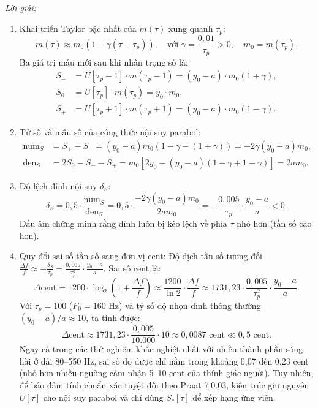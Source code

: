 \textit{Lời giải:}
\begin{enumerate}[leftmargin=1.5em]
    \item Khai triển Taylor bậc nhất của $m(\tau)$ xung quanh $\tau_p$:
    \begin{equation}
        m(\tau) \approx m_0 \left(1 - \gamma (\tau - \tau_p)\right), \quad \text{với } \gamma = \frac{0{,}01}{\tau_p} > 0, \quad m_0 = m(\tau_p).
    \end{equation}
    Ba giá trị mẫu mới sau khi nhân trọng số là:
    \begin{align}
        S_{-} &= U[\tau_p - 1] \cdot m(\tau_p - 1) = (y_0 - a) \cdot m_0 (1 + \gamma), \\
        S_{0} &= U[\tau_p] \cdot m(\tau_p) = y_0 \cdot m_0, \\
        S_{+} &= U[\tau_p + 1] \cdot m(\tau_p + 1) = (y_0 - a) \cdot m_0 (1 - \gamma).
    \end{align}
    \item Tử số và mẫu số của công thức nội suy parabol:
    \begin{align}
        \text{num}_S &= S_{+} - S_{-} = (y_0 - a) m_0 (1 - \gamma - (1 + \gamma)) = -2\gamma (y_0 - a) m_0, \\
        \text{den}_S &= 2S_0 - S_{-} - S_{+} = m_0 \left[2y_0 - (y_0 - a)(1 + \gamma + 1 - \gamma)\right] = 2 a m_0.
    \end{align}
    \item Độ lệch đỉnh nội suy $\delta_S$:
    \begin{equation}
        \delta_S = 0{,}5 \cdot \frac{\text{num}_S}{\text{den}_S} = 0{,}5 \cdot \frac{-2\gamma (y_0 - a) m_0}{2 a m_0} = -\frac{0{,}005}{\tau_p} \cdot \frac{y_0 - a}{a} < 0.
    \end{equation}
    Dấu âm chứng minh rằng đỉnh luôn bị kéo lệch về phía $\tau$ nhỏ hơn (tần số cao hơn).
    \item Quy đổi sai số tần số sang đơn vị cent:
    Độ dịch tần số tương đối $\frac{\Delta f}{f} \approx -\frac{\delta_S}{\tau_p} = \frac{0{,}005}{\tau_p^2} \cdot \frac{y_0 - a}{a}$.
    Sai số cent là:
    \begin{equation}
        \Delta \text{cent} = 1200 \cdot \log_2\left(1 + \frac{\Delta f}{f}\right) \approx \frac{1200}{\ln 2} \cdot \frac{\Delta f}{f} \approx 1731{,}23 \cdot \frac{0{,}005}{\tau_p^2} \cdot \frac{y_0 - a}{a}.
    \end{equation}
    Với $\tau_p = 100$ ($F_0 = 160\text{ Hz}$) và tỷ số độ nhọn đỉnh thông thường $(y_0 - a)/a \approx 10$, ta tính được:
    \begin{equation}
        \Delta \text{cent} \approx 1731{,}23 \cdot \frac{0{,}005}{10.000} \cdot 10 \approx 0{,}0087\text{ cent} \ll 0{,}5\text{ cent}.
    \end{equation}
    Ngay cả trong các thử nghiệm khắc nghiệt nhất với nhiều thành phần sóng hài ở dải 80--550 Hz, sai số đo được chỉ nằm trong khoảng 0,07 đến 0,23 cent (nhỏ hơn nhiều ngưỡng cảm nhận 5--10 cent của thính giác người). Tuy nhiên, để bảo đảm tính chuẩn xác tuyệt đối theo Praat 7.0.03, kiến trúc giữ nguyên $U[\tau]$ cho nội suy parabol và chỉ dùng $S_c[\tau]$ để xếp hạng ứng viên.
\end{enumerate}

